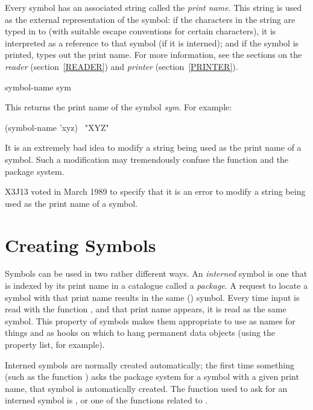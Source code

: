 Every symbol has an associated string called the \emph{print name}.
This string is used as the external representation of the symbol:
if the characters in the string are typed in to 
(with suitable escape conventions for certain characters),
it is interpreted as a reference to that symbol
(if it is interned); and if the symbol is printed,  types out the
print name.
For more information, see the sections on the \emph{reader}
(section~\ref{READER})
and \emph{printer} (section~\ref{PRINTER}).

\begin{defun}[Function]
symbol-name sym

This returns the print name of the symbol \emph{sym}.
For example:
\begin{lisp}
(symbol-name 'xyz) \EV\ "XYZ"
\end{lisp}
It is an extremely bad idea to modify a string being used as the print name of
a symbol.  Such a modification may tremendously confuse
the function  and the package system.

\begin{newer}
X3J13 voted in March 1989 
to specify that it is an error to modify a string being used
as the print name of a symbol.
\end{newer}
\end{defun}

\section{Creating Symbols}

Symbols can be used in two rather different ways.
An \emph{interned} symbol is one that is indexed by its print name
in a catalogue called a \emph{package}.
A request to locate a symbol with that print name results
in the same () symbol.  Every time input is read with the
function ,
and that print name appears, it is read as the same symbol.
This property of symbols makes them appropriate to use as names for
things and as hooks on which to hang permanent data objects
(using the property list, for example).

Interned symbols are normally created automatically; the first time
something (such as the function )
asks the package system for a symbol with a given print name,
that symbol is automatically created.  The function used to ask for
an interned symbol is , or one of the functions
related to .

